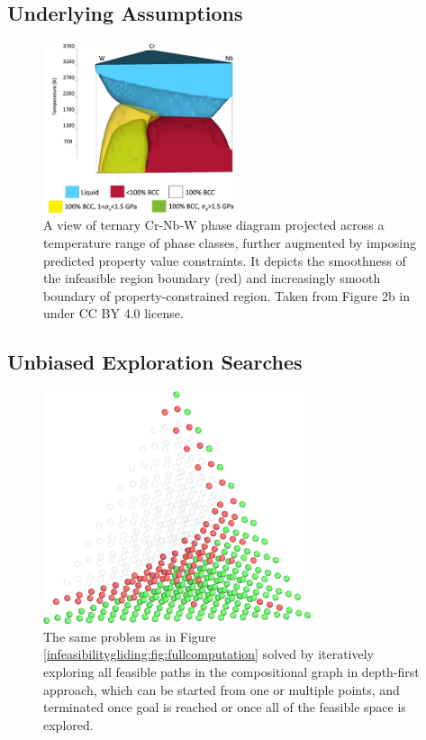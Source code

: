 \subsection{Underlying Assumptions} \label{infglide:ssec:assumptions}

\todo

\begin{figure}[H]
    \centering
    \includegraphics[width=0.5\textwidth]{infeasibilitygliding/PhaseTernaryMap_Elder2023.png}
    \caption{A view of ternary Cr-Nb-W phase diagram projected across a temperature range of phase classes, further augmented by imposing predicted property value constraints. It depicts the smoothness of the infeasible region boundary (red) and increasingly smooth boundary of property-constrained region. Taken from Figure 2b in \citet{Elder2023ComputationalValidation} under CC BY 4.0 license.}
    \label{infeasibilitygliding:fig:katesphasemap}
\end{figure}


\subsection{Unbiased Exploration Searches} \label{infglide:ssec:unbiasedexplore}

\todo 

\begin{figure}[H]
    \centering
    \includegraphics[width=0.7\textwidth]{infeasibilitygliding/InfeasibilityGliding_Glide.png}
    \caption{The same problem as in Figure \ref{infeasibilitygliding:fig:fullcomputation} solved by iteratively exploring all feasible paths in the compositional graph in depth-first approach, which can be started from one or multiple points, and terminated once goal is reached or once all of the feasible space is explored.}
    \label{infeasibilitygliding:fig:glide}
\end{figure}


\printbibliography[heading=subbibintoc]